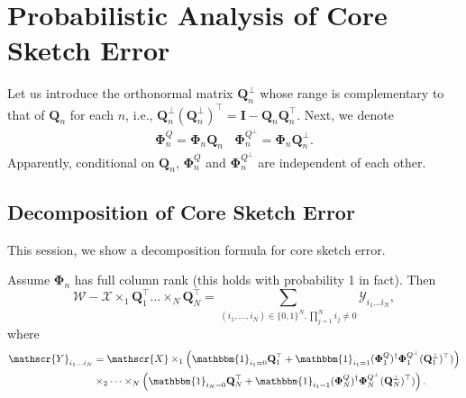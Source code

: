 \section{Probabilistic Analysis of Core Sketch Error}
Let us introduce the orthonormal matrix $\mathbf{Q}_n^\bot$ whose range is complementary to that of $\mathbf{Q}_n$ for each $n$, i.e., $\mathbf{Q}_n^\bot (\mathbf{Q}_n^\bot)^\top = \mathbf{I} - \mathbf{Q}_n\mathbf{Q}_n^\top$. Next, we denote 
\begin{equation}
\begin{aligned}
\mathbf{\Phi}_n^Q = \mathbf{\Phi}_n \mathbf{Q}_n  ~~~~\mathbf{\Phi}_n^{Q^\bot} = \mathbf{\Phi}_n \mathbf{Q}_n^\bot.  
\end{aligned}
\end{equation}
Apparently, conditional on $\mathbf{Q}_n$, $\mathbf{\Phi}_n^Q$ and $\mathbf{\Phi}_n^{Q^\bot}$ are independent of each other. 

\subsection{Decomposition of Core Sketch Error}
This session, we show a decomposition formula for core sketch error.  
\begin{lem}
\label{lemma:core_error_decomposition}
Assume $\mathbf{\Phi}_n$ has full column rank (this holds with probability 1 in fact). Then
\begin{equation}
\mathscr{W} - \mathscr{X}\times_1 \mathbf{Q}_1^\top \dots \times_N \mathbf{Q}_N^\top = 
\sum_{(i_1,\dots, i_N) \in \{0,1\}^N, \prod_{j=1}^N i_j \neq 0} \mathscr{Y}_{i_1\dots i_N}, 
\end{equation}
where 
\begin{equation}
\label{eq:def_each_part}
\begin{aligned}
\mathscr{Y}_{i_1\dots i_N} &= \mathscr{X}\times_1 \left(\mathbbm{1}_{i_1=0}\mathbf{Q}_1^\top + \mathbbm{1}_{i_1=1}(\mathbf{\Phi}_1^Q)^\dag  \mathbf{\Phi}_1^{Q^\bot}(\mathbf{Q}_1^\bot)^\top) \right)\\
&\times_2 \dots \times_N \left(\mathbbm{1}_{i_N=0}\mathbf{Q}_N^\top + \mathbbm{1}_{i_1=1}(\mathbf{\Phi}_N^Q)^\dag  \mathbf{\Phi}_N^{Q^\bot}(\mathbf{Q}_N^\bot)^\top) \right).
\end{aligned}
\end{equation}
\end{lem}


